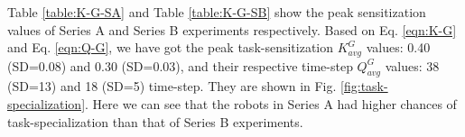 \documentclass[journal]{IEEEtran}
\begin{document}
Table \ref{table:K-G-SA} and Table \ref{table:K-G-SB} show the peak sensitization values of Series A and Series B experiments respectively.  Based on Eq. \ref{eqn:K-G} and Eq. \ref{eqn:Q-G}, we have got the peak task-sensitization $K^G_{avg} 
$ values: 0.40 (SD=0.08)  and 0.30 (SD=0.03), and their respective time-step $Q^G_{avg}$ values: 38 (SD=13) and 18 (SD=5) time-step.  They are shown in Fig. \ref{fig:task-specialization}. Here we can see that the robots in Series A had higher chances of task-specialization than that of Series B experiments.
\end{document}
